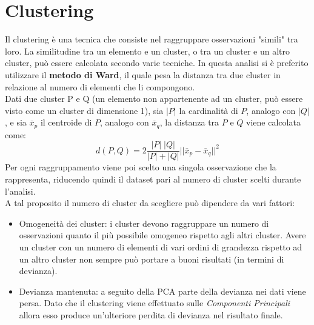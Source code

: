 \section{Clustering}
Il clustering è una tecnica che consiste nel raggruppare osservazioni "simili" tra loro. La similitudine tra un elemento e un cluster, o tra un cluster e un altro cluster, può essere calcolata secondo varie tecniche. In questa analisi si è preferito utilizzare il \textbf{metodo di Ward}, il quale pesa la distanza tra due cluster in relazione al numero di elementi che li compongono.
\\Dati due cluster P e Q (un elemento non appartenente ad un cluster, può essere visto come un cluster di dimensione 1), sia $|P|$ la cardinalità di $P$, analogo con $|Q|$, e sia $\bar{x}_p$ il centroide di $P$, analogo con $\bar{x}_q$, la distanza tra $P$ e $Q$ viene calcolata come:
\begin{equation*}
	d(P,Q) = 2 \dfrac{|P| \; |Q|}{|P| + |Q|} ||\bar{x}_p - \bar{x}_q ||^2
\end{equation*}
Per ogni raggruppamento viene poi scelto una singola osservazione che la rappresenta, riducendo quindi il dataset pari al numero di cluster scelti durante l'analisi.
\\A tal proposito il numero di cluster da scegliere può dipendere da vari fattori:
\begin{itemize}
	\item Omogeneità dei cluster: i cluster devono raggruppare un numero di osservazioni quanto il più possibile omogeneo rispetto agli altri cluster. Avere un cluster con un numero di elementi di vari ordini di grandezza rispetto ad un altro cluster non sempre può portare a buoni risultati (in termini di devianza).
	\item Devianza mantenuta: a seguito della PCA parte della devianza nei dati viene persa. Dato che il clustering viene effettuato sulle \textit{Componenti Principali} allora esso produce un'ulteriore perdita di devianza nel risultato finale.
\end{itemize}
 
